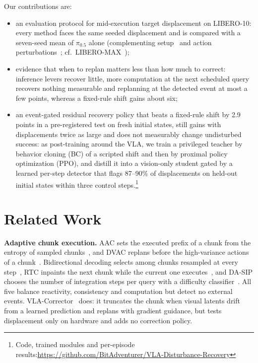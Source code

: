 \documentclass[conference,a4paper]{IEEEtran}
\begin{document}
Our contributions are:
\begin{itemize}
  \item an evaluation protocol for mid-execution target displacement on LIBERO-10: every method faces the same seeded displacement and is compared with a seven-seed mean
        of $\pi_{0.5}$ alone
        (complementing setup~\cite{fei2025liberoplus} and action perturbations~\cite{guo2026robustvla,gao2026ogpo}; cf.\ \mbox{LIBERO-MAX}~\cite{zhang2026liberomax});
  \item evidence that when to replan matters less than how much to correct: inference levers recover little,
        more computation at the next scheduled query recovers nothing measurable and replanning at the detected event
        at most a few points, whereas a fixed-rule shift gains about six;
  \item an event-gated residual recovery policy that beats a fixed-rule shift by 2.9 points in a pre-registered
        test on fresh initial states, still gains with displacements twice as large and does not measurably change
        undisturbed success: as post-training around the VLA, we train a privileged teacher
        by behavior cloning (BC) of a scripted shift and then by proximal policy optimization (PPO), and distill it into a vision-only student gated by a learned per-step detector that flags 87--90\% of displacements on held-out
        initial states within three control steps.\footnote{Code, trained modules and per-episode results:\newline \url{https://github.com/BitAdventurer/VLA-Disturbance-Recovery}}
\end{itemize}

\section{Related Work}\label{sec:related}

\noindent\textbf{Adaptive chunk execution.}
AAC sets the executed prefix of a chunk from the entropy of sampled
chunks~\cite{liang2026aac}, and DVAC replans before the high-variance
actions of a chunk~\cite{feng2026dvac}. Bidirectional decoding selects among chunks
resampled at every step~\cite{liu2025bid}, RTC inpaints the next chunk
while the current one executes~\cite{black2025rtc}, and DA-SIP chooses the number of integration
steps per query with a difficulty classifier~\cite{chun2025dasip}. All five balance reactivity, consistency and computation but detect no external events. VLA-Corrector~\cite{pan2026corrector} does: it truncates the chunk when visual latents drift from a learned prediction and replans with gradient guidance, but tests displacement only on hardware and adds no correction policy.
\end{document}
